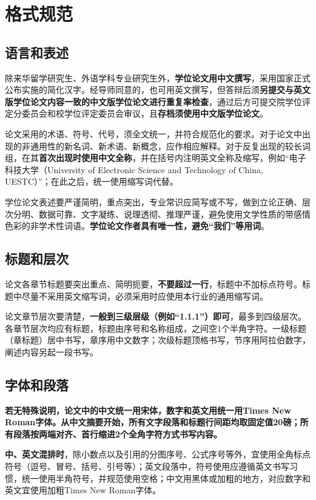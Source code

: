 \chapter{格式规范}

\section{语言和表述}
除来华留学研究生、外语学科专业研究生外，\textbf{学位论文用中文撰写}，采用国家正式公布实施的简化汉字。经导师同意的，也可用英文撰写，但答辩后须\textbf{另提交与英文版学位论文内容一致的中文版学位论文进行重复率检查}，通过后方可提交院学位评定分委员会和校学位评定委员会审议，且\textbf{存档须使用中文版学位论文}。


论文采用的术语、符号、代号，须全文统一，并符合规范化的要求。对于论文中出现的非通用性的新名词、新术语、新概念，应作相应解释。对于反复出现的较长词组，在其\textbf{首次出现时使用中文全称}，并在括号内注明英文全称及缩写，例如“电子科技大学（University of Electronic Science and Technology of China, UESTC）”；在此之后，统一使用缩写词代替。

学位论文表述要严谨简明，重点突出，专业常识应简写或不写，做到立论正确、层次分明、数据可靠、文字凝练、说理透彻、推理严谨，避免使用文学性质的带感情色彩的非学术性词语。\textbf{学位论文作者具有唯一性，避免“我们”等用词}。

\section{标题和层次}
论文各章节标题要突出重点、简明扼要，\textbf{不要超过一行}，标题中不加标点符号。标题中尽量不采用英文缩写词，必须采用时应使用本行业的通用缩写词。

论文章节层次要清楚，\textbf{一般到三级层级（例如“1.1.1”）即可}，最多到四级层次。各章节层次均应有标题，标题由序号和名称组成，之间空1个半角字符。一级标题（章标题）居中书写，章序用中文数字；次级标题顶格书写，节序用阿拉伯数字，阐述内容另起一段书写。

\section{字体和段落}
\textbf{若无特殊说明，论文中的中文统一用宋体，数字和英文用统一用Times New Roman字体。从中文摘要开始，所有文字段落和标题行间距均取固定值20磅；所有段落按两端对齐、首行缩进2个全角字符方式书写内容。}

\textbf{中、英文混排时}，除小数点以及引用的分图序号、公式序号等外，宜使用全角标点符号（逗号、冒号、括号、引号等）；英文段落中，符号使用应遵循英文书写习惯，统一使用半角符号，并规范使用空格；中文用黑体或加粗的地方，对应数字和英文宜使用加粗Times New Roman字体。

